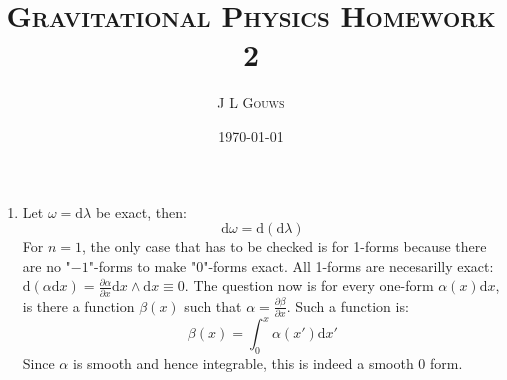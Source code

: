 \documentclass[12pt,a4]{article}
\title{
\textsc{Gravitational Physics Homework 2}
}
\author{\textsc{J L Gouws}
}
\date{\today
\\[1cm]}
\newcommand{\e}{\mathrm{d}}
\begin{document}
\thispagestyle{empty}

\maketitle

\begin{enumerate}
  \item
    Let $\omega = \e \lambda$ be exact, then:
    \begin{equation*}
      \e \omega = \e( \e \lambda )
    \end{equation*}
    For $n = 1$, the only case that has to be checked is for 1-forms because there are no "$-1$"-forms to make "0"-forms exact.
    All 1-forms are necesarilly exact: $\e (\alpha \e x) = \frac{\partial \alpha}{\partial x} \e x \wedge \e x \equiv 0$.
    The question now is for every one-form $\alpha(x) \e x$, is there a function $\beta(x)$ such that $\alpha = \frac{\partial \beta}{\partial x}$.
    Such a function is:
    \begin{equation*}
      \beta(x) = \int_0^x \alpha(x') \e x'
    \end{equation*}
    Since $\alpha$ is smooth and hence integrable, this is indeed a smooth $0$ form.


\end{enumerate}
\end{document}
